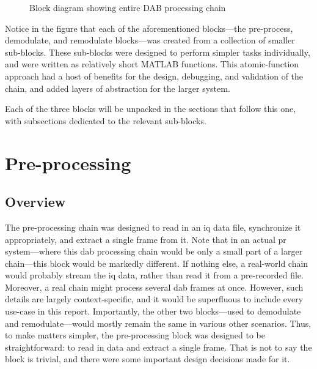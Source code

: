 \documentclass[class=report,11pt,crop=false]{standalone}
\begin{document}
\begin{figure}[htbp]
  \centering
  \captionsetup{type=figure}
  \def\svgwidth{\linewidth}
  { %
      }
  \caption{Block diagram showing entire DAB processing chain}
  \label{fig:BD_Overview_All}
\end{figure}

Notice in the figure that each of the aforementioned blocks---the pre-process, demodulate, and remodulate blocks---was created from a collection of smaller sub-blocks. These sub-blocks were designed to perform simpler tasks individually, and were written as relatively short MATLAB functions. This atomic-function approach had a host of benefits for the design, debugging, and validation of the chain, and added layers of abstraction for the larger system.

Each of the three blocks will be unpacked in the sections that follow this one, with subsections dedicated to the relevant sub-blocks.

\section{Pre-processing \label{sect:dab-proc_preprocessing}}
\subsection{Overview}
The pre-processing chain was designed to read in an \gls{iq} data file, synchronize it appropriately, and extract a single frame from it. Note that in an actual \gls{pr} system---where this \gls{dab} processing chain would be only a small part of a larger chain---this block would be markedly different. If nothing else, a real-world chain would probably stream the \gls{iq} data, rather than read it from a pre-recorded file. Moreover, a real chain might process several \gls{dab} frames at once. However, such details are largely context-specific, and it would be superfluous to include every use-case in this report. Importantly, the other two blocks---used to demodulate and remodulate---would mostly remain the same in various other scenarios. Thus, to make matters simpler, the pre-processing block was designed to be straightforward: to read in data and extract a single frame. That is not to say the block is trivial, and there were some important design decisions made for it.
\end{document}
